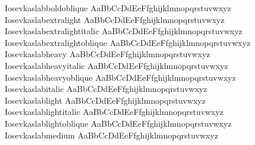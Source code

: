 \begin{tabbing}
Iosevkaslabboldoblique \> { AaBbCcDdEeFfghijklmnopqrstuvwxyz} \\
Iosevkaslabextralight \> { AaBbCcDdEeFfghijklmnopqrstuvwxyz} \\
Iosevkaslabextralightitalic \> { AaBbCcDdEeFfghijklmnopqrstuvwxyz} \\
Iosevkaslabextralightoblique \> { AaBbCcDdEeFfghijklmnopqrstuvwxyz} \\
Iosevkaslabheavy \> { AaBbCcDdEeFfghijklmnopqrstuvwxyz} \\
Iosevkaslabheavyitalic \> { AaBbCcDdEeFfghijklmnopqrstuvwxyz} \\
Iosevkaslabheavyoblique \> { AaBbCcDdEeFfghijklmnopqrstuvwxyz} \\
Iosevkaslabitalic \> { AaBbCcDdEeFfghijklmnopqrstuvwxyz} \\
Iosevkaslablight \> { AaBbCcDdEeFfghijklmnopqrstuvwxyz} \\
Iosevkaslablightitalic \> { AaBbCcDdEeFfghijklmnopqrstuvwxyz} \\
Iosevkaslablightoblique \> { AaBbCcDdEeFfghijklmnopqrstuvwxyz} \\
Iosevkaslabmedium \> { AaBbCcDdEeFfghijklmnopqrstuvwxyz} \\

\end{tabbing}
